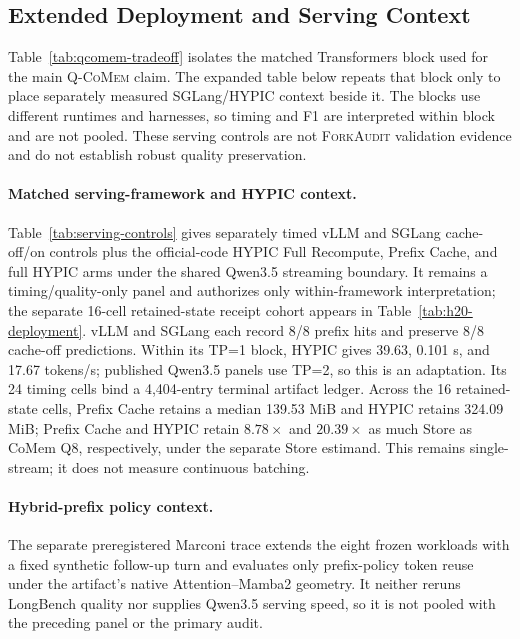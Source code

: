\documentclass{article}
\newcommand{\qcomem}{\textsc{Q-CoMem}}
\newcommand{\method}{\textsc{ForkAudit}}
\begin{document}
\subsection{Extended Deployment and Serving Context}
\label{app:illustrative-store}

Table~\ref{tab:qcomem-tradeoff} isolates the matched Transformers block used for
the main \qcomem{} claim.  The expanded table below repeats that block only to
place separately measured SGLang/HYPIC context beside it.  The blocks use
different runtimes and harnesses, so timing and F1 are interpreted within block
and are not pooled.  These serving controls are not \method{} validation
evidence and do not establish robust quality preservation.



\paragraph{Matched serving-framework and HYPIC context.}
Table~\ref{tab:serving-controls} gives separately timed vLLM and SGLang
cache-off/on controls plus the official-code HYPIC Full Recompute, Prefix
Cache, and full HYPIC arms under the shared Qwen3.5 streaming boundary.  It
remains a timing/quality-only panel and authorizes only within-framework
interpretation; the separate 16-cell retained-state receipt cohort appears in
Table~\ref{tab:h20-deployment}.
vLLM and SGLang each record 8/8 prefix hits and preserve 8/8 cache-off
predictions.  Within its TP=1 block, HYPIC gives 39.63, 0.101 s, and 17.67
tokens/s; published Qwen3.5 panels use TP=2, so this is an adaptation.  Its 24
timing cells bind a 4,404-entry terminal artifact ledger.  Across the
16 retained-state cells, Prefix Cache retains a median 139.53 MiB and HYPIC
retains 324.09 MiB; Prefix Cache and HYPIC retain $8.78\times$ and
$20.39\times$ as much Store as CoMem Q8, respectively, under the separate
Store estimand.  This remains single-stream; it does not measure continuous
batching.


\paragraph{Hybrid-prefix policy context.}
The separate preregistered Marconi trace extends the eight frozen workloads
with a fixed synthetic follow-up turn and evaluates only prefix-policy token
reuse under the artifact's native Attention--Mamba2 geometry.  It neither
reruns LongBench quality nor supplies Qwen3.5 serving speed, so it is not
pooled with the preceding panel or the primary audit.

\end{document}
